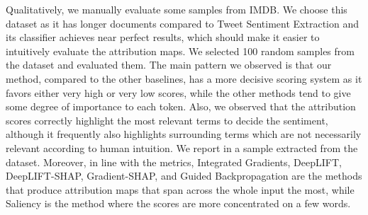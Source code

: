 Qualitatively, we manually evaluate some samples from IMDB. We choose this dataset as it has longer documents compared to Tweet Sentiment Extraction and its classifier achieves near perfect results, which should make it easier to intuitively evaluate the attribution maps. We selected 100 random samples from the dataset and evaluated them. The main pattern we observed is that our method, compared to the other baselines, has a more decisive scoring system as it favors either very high or very low scores, while the other methods tend to give some degree of importance to each token. Also, we observed that the attribution scores correctly highlight the most relevant terms to decide the sentiment, although it frequently also highlights surrounding terms which are not necessarily relevant according to human intuition. We report in  a sample extracted from the dataset. Moreover, in line with the metrics, Integrated Gradients, DeepLIFT, DeepLIFT-SHAP, Gradient-SHAP, and Guided Backpropagation are the methods that produce attribution maps that span across the whole input the most, while Saliency is the method where the scores are more concentrated on a few words.

